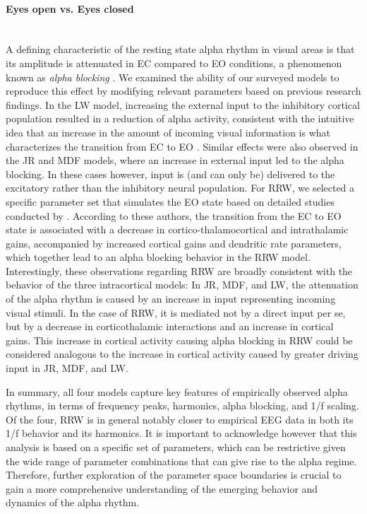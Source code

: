\documentclass[12pt,twoside]{article}
\begin{document}
\paragraph{Eyes open vs. Eyes closed} ~\\
A defining characteristic of the resting state alpha rhythm in visual areas is that its amplitude is attenuated in EC compared to EO conditions, a phenomenon known as \textit{alpha blocking} \citep{barry2017eeg, adrian1934berger, chapman1962quantitative}. We examined the ability of our surveyed models to reproduce this effect by modifying relevant parameters based on previous research findings. In the LW model, increasing the external input to the inhibitory cortical population resulted in a reduction of alpha activity, consistent with the intuitive idea that an increase in the amount of incoming visual information is what characterizes the transition from EC to EO \citep{hartoyo2020inferring}. Similar effects were also observed in the JR and MDF models, where an increase in external input led to the alpha blocking. In these cases however, input is (and can only be) delivered to the excitatory rather than the inhibitory neural population. 
For RRW, we selected a specific parameter set that simulates the EO state based on detailed studies conducted by
\citep{rowe2004estimation}. According to these authors, the transition from the EC to EO state is associated with a decrease in cortico-thalamocortical and intrathalamic gains, accompanied by increased cortical gains and dendritic rate parameters, which together lead to an alpha blocking behavior in the RRW model. Interestingly, these observations regarding RRW are broadly consistent with the behavior of the three intracortical models: In JR, MDF, and LW, the attenuation of the alpha rhythm is caused by an increase in input representing incoming visual stimuli. In the case of RRW, it is mediated not by a direct input per se, but by a decrease in corticothalamic interactions and an increase in cortical gains. This increase in cortical activity causing alpha blocking in RRW could be considered analogous to the increase in cortical activity caused by greater driving input in JR, MDF, and LW.

In summary, all four models capture key features of empirically observed alpha rhythms, in terms of frequency peaks, harmonics, alpha blocking, and 1/f scaling. %
Of the four, RRW is in general notably closer to empirical EEG data in both its 1/f behavior and its harmonics. It is important to acknowledge however that this analysis is based on a specific set of parameters, which can be restrictive given the wide range of parameter combinations that can give rise to the alpha regime. Therefore, further exploration of the parameter space boundaries is crucial to gain a more comprehensive understanding of the emerging behavior and dynamics of the alpha rhythm.  
\end{document}
